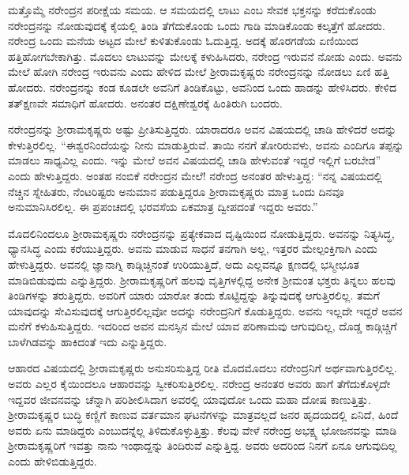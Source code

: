 ಮತ್ತೊಮ್ಮೆ ನರೇಂದ್ರನ ಪರೀಕ್ಷೆಯ ಸಮಯ. ಆ ಸಮಯದಲ್ಲಿ ಲಾಟು ಎಂಬ ಸೇವಕ ಭಕ್ತನನ್ನು ಕರೆದುಕೊಂಡು ನರೇಂದ್ರನನ್ನು ನೋಡುವುದಕ್ಕೆ ಕೈಯಲ್ಲಿ ತಿಂಡಿ ತೆಗೆದುಕೊಂಡು ಒಂದು ಗಾಡಿ ಮಾಡಿಕೊಂಡು ಕಲ್ಕತ್ತೆಗೆ ಹೋದರು. ನರೇಂದ್ರ ಒಂದು ಮನೆಯ ಅಟ್ಟದ ಮೇಲೆ ಕುಳಿತುಕೊಂಡು ಓದುತ್ತಿದ್ದ. ಅದಕ್ಕೆ ಹೊರಗಡೆಯ ಏಣಿಯಿಂದ ಹತ್ತಿಹೋಗಬೇಕಾಗಿತ್ತು. ಮೊದಲು ಲಾಟುವನ್ನು ಮೇಲಕ್ಕೆ ಕಳುಹಿಸಿದರು, ನರೇಂದ್ರ ಇರುವನೆ ನೋಡು ಎಂದು. ಅವನು ಮೇಲೆ ಹೋಗಿ ನರೇಂದ್ರ ಇರುವನು ಎಂದು ಹೇಳಿದ ಮೇಲೆ ಶ‍್ರೀರಾಮಕೃಷ್ಣರು ನರೇಂದ್ರನನ್ನು ನೋಡಲು ಏಣಿ ಹತ್ತಿ ಹೋದರು. ನರೇಂದ್ರನನ್ನು ಕಂಡ ಕೂಡಲೇ ಅವನಿಗೆ ತಿಂಡಿಕೊಟ್ಟು, ಅವನಿಂದ ಒಂದು ಹಾಡನ್ನು ಹೇಳಿಸಿದರು. ಕೇಳಿದ ತತ್‍ಕ್ಷಣವೇ ಸಮಾಧಿಗೆ ಹೋದರು. ಅನಂತರ ದಕ್ಷಿಣೇಶ್ವರಕ್ಕೆ ಹಿಂತಿರುಗಿ ಬಂದರು.

ನರೇಂದ್ರನನ್ನು ಶ‍್ರೀರಾಮಕೃಷ್ಣರು ಅಷ್ಟು ಪ್ರೀತಿಸುತ್ತಿದ್ದರು. ಯಾರಾದರೂ ಅವನ ವಿಷಯದಲ್ಲಿ ಚಾಡಿ ಹೇಳಿದರೆ ಅದನ್ನು ಕೇಳುತ್ತಿರಲಿಲ್ಲ. “ಈಶ್ವರನಿಂದೆಯನ್ನು ನೀನು ಮಾಡುತ್ತಿರುವೆ. ತಾಯಿ ನನಗೆ ತೋರಿರುವಳು, ಅವನು ಎಂದಿಗೂ ತಪ್ಪನ್ನು ಮಾಡಲು ಸಾಧ್ಯವಿಲ್ಲ ಎಂದು. ಇನ್ನು ಮೇಲೆ ಅವನ ವಿಷಯದಲ್ಲಿ ಚಾಡಿ ಹೇಳುವಂತೆ ಇದ್ದರೆ ಇಲ್ಲಿಗೆ ಬರಬೇಡ” ಎಂದು ಹೇಳುತ್ತಿದ್ದರು. ಅಂತಹ ನಂಬಿಕೆ ನರೇಂದ್ರನ ಮೇಲೆ! ನರೇಂದ್ರ ಅನಂತರ ಹೇಳುತ್ತಿದ್ದ: “ನನ್ನ ವಿಷಯದಲ್ಲಿ ನೆಚ್ಚಿನ ಸ್ನೇಹಿತರು, ನೆಂಟರಿಷ್ಟರು ಅನುಮಾನ ಪಡುತ್ತಿದ್ದರೂ ಶ‍್ರೀರಾಮಕೃಷ್ಣರು ಮಾತ್ರ ಒಂದು ದಿನವೂ ಅನುಮಾನಿಸಿರಲಿಲ್ಲ. ಈ ಪ್ರಪಂಚದಲ್ಲಿ ಭರವಸೆಯ ಏಕಮಾತ್ರ ದ್ವೀಪದಂತೆ ಇದ್ದರು ಅವರು.”

ಮೊದಲಿನಿಂದಲೂ ಶ‍್ರೀರಾಮಕೃಷ್ಣರು ನರೇಂದ್ರನನ್ನು ಪ್ರತ್ಯೇಕವಾದ ದೃಷ್ಟಿಯಿಂದ ನೋಡುತ್ತಿದ್ದರು. ಅವನನ್ನು ನಿತ್ಯಸಿದ್ಧ, ಧ್ಯಾನಸಿದ್ಧ ಎಂದು ಕರೆಯುತ್ತಿದ್ದರು. ಅವನು ಮಾಡುವ ಸಾಧನೆ ತನಗಾಗಿ ಅಲ್ಲ, ಇತ್ತರರ ಮೇಲ್ಪಂಕ್ತಿಗಾಗಿ ಎಂದು ಹೇಳುತ್ತಿದ್ದರು. ಅವನಲ್ಲಿ ಜ್ಞಾನಾಗ್ನಿ ಕಾಡ್ಗಿಚ್ಚಿನಂತೆ ಉರಿಯುತ್ತಿದೆ, ಅದು ಎಲ್ಲವನ್ನೂ ಕ್ಷಣದಲ್ಲಿ ಭಸ್ಮೀಭೂತ ಮಾಡಿಬಿಡುವುದು ಎನ್ನುತ್ತಿದ್ದರು. ಶ‍್ರೀರಾಮಕೃಷ್ಣರಿಗೆ ಹಲವು ವೃತ್ತಿಗಳಲ್ಲಿದ್ದ ಅನೇಕ ಶ‍್ರೀಮಂತ ಭಕ್ತರು ತಿನ್ನಲು ಹಲವು ತಿಂಡಿಗಳನ್ನು ತರುತ್ತಿದ್ದರು. ಅವರಿಗೆ ಯಾರು ಯಾರೋ ತಂದು ಕೊಟ್ಟಿದ್ದನ್ನು ತಿನ್ನುವುದಕ್ಕೆ ಆಗುತ್ತಿರಲಿಲ್ಲ. ತಮಗೆ ಯಾವುದನ್ನು ಸೇವಿಸುವುದಕ್ಕೆ ಆಗುತ್ತಿರಲಿಲ್ಲವೋ ಅದನ್ನು ನರೇಂದ್ರನಿಗೆ ಕೊಡುತ್ತಿದ್ದರು. ಅವನು ಇಲ್ಲದೇ ಇದ್ದರೆ ಅವನ ಮನೆಗೆ ಕಳುಹಿಸುತ್ತಿದ್ದರು. ಇದರಿಂದ ಅವನ ಮನಸ್ಸಿನ ಮೇಲೆ ಯಾವ ಪರಿಣಾಮವು ಆಗುವುದಿಲ್ಲ, ದೊಡ್ಡ ಕಾಡ್ಗಿಚ್ಚಿಗೆ ಬಾಳೆಗಿಡವನ್ನು ಹಾಕಿದಂತೆ ಇದು ಎನ್ನುತ್ತಿದ್ದರು.

ಆಹಾರದ ವಿಷಯದಲ್ಲಿ ಶ‍್ರೀರಾಮಕೃಷ್ಣರು ಅನುಸರಿಸುತ್ತಿದ್ದ ರೀತಿ ಮೊದಮೊದಲು ನರೇಂದ್ರನಿಗೆ ಅರ್ಥವಾಗುತ್ತಿರಲಿಲ್ಲ. ಅವರು ಎಲ್ಲರ ಕೈಯಿಂದಲೂ ಆಹಾರವನ್ನು ಸ್ವೀಕರಿಸುತ್ತಿರಲಿಲ್ಲ. ನರೇಂದ್ರ ಅನಂತರ ಅವರು ಹಾಗೆ ತೆಗೆದುಕೊಳ್ಳದೇ ಇದ್ದವರ ಜೀವನವನ್ನು ಚೆನ್ನಾಗಿ ಪರಿಶೀಲಿಸಿದಾಗ ಅವರಲ್ಲಿ ಯಾವುದೋ ಒಂದು ಮಹಾ ದೋಷ ಕಾಣುತ್ತಿತ್ತು. ಶ‍್ರೀರಾಮಕೃಷ್ಣರ ಬುದ್ಧಿ ಕಣ್ಣಿಗೆ ಕಾಣುವ ವರ್ತಮಾನ ಘಟನೆಗಳನ್ನು ಮಾತ್ರವಲ್ಲದೆ ಜನರ ಹೃದಯದಲ್ಲಿ ಏನಿದೆ, ಹಿಂದೆ ಅವರು ಏನು ಮಾಡಿದ್ದರು ಎಂಬುದನ್ನೆಲ್ಲ ತಿಳಿದುಕೊಳ್ಳುತ್ತಿತ್ತು. ಕೆಲವು ವೇಳೆ ನರೇಂದ್ರ ಅಭಕ್ಷ್ಯ ಭೋಜನವನ್ನು ಮಾಡಿ ಶ‍್ರೀರಾಮಕೃಷ್ಣರಿಗೆ ಇವತ್ತು ನಾನು ಇಂಥಾದ್ದನ್ನು ತಿಂದಿರುವೆ ಎನ್ನುತ್ತಿದ್ದ. ಅವರು ಅದರಿಂದ ನಿನಗೆ ಏನೂ ಆಗುವುದಿಲ್ಲ ಎಂದು ಹೇಳಿಬಿಡುತ್ತಿದ್ದರು.

